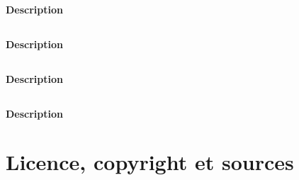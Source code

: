 \paragraph{Description} \descriptifFFa

\subsection{\formationFb}
\paragraph{Description} \descriptifFFb

\subsection{\formationG}
\paragraph{Description} \descriptifFG

\subsection{\formationH}
\paragraph{Description} \descriptifFH


\section{Licence, copyright et sources}

